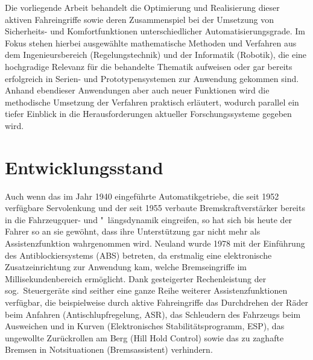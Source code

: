 Die vorliegende Arbeit behandelt die Optimierung und Realisierung dieser aktiven Fahreingriffe sowie deren Zusammenspiel bei der Umsetzung von Sicherheits- und Komfortfunktionen unterschiedlicher Automatisierungsgrade. Im Fokus stehen hierbei ausgewählte mathematische Methoden und Verfahren aus dem Ingenieursbereich (Regelungstechnik) und der Informatik (Robotik), die eine hochgradige Relevanz für die behandelte Thematik aufweisen oder gar bereits erfolgreich in Serien- und Prototypensystemen zur Anwendung gekommen sind. Anhand ebendieser Anwendungen aber auch neuer Funktionen wird die methodische Umsetzung der Verfahren praktisch erläutert, wodurch parallel ein tiefer Einblick in die Herausforderungen aktueller Forschungssysteme gegeben wird. 

\section{Entwicklungsstand}
Auch wenn das im Jahr 1940 eingeführte Automatikgetriebe, die seit 1952 verfügbare Servolenkung und der seit 1955 verbaute Bremskraftverstärker bereits in die Fahrzeugquer- und "~längsdynamik eingreifen, so hat sich bis heute der Fahrer so an sie gewöhnt, dass ihre Unterstützung gar nicht mehr als Assistenzfunktion wahrgenommen wird. Neuland wurde 1978 mit der Einführung des Antiblockiersystems (ABS) betreten, da erstmalig eine elektronische Zusatzeinrichtung zur Anwendung kam, welche Bremseingriffe im Millisekundenbereich ermöglicht. Dank gesteigerter Rechenleistung der sog.\ Steuergeräte sind seither eine ganze Reihe weiterer Assistenzfunktionen verfügbar, die beispielweise durch aktive Fahreingriffe das Durchdrehen der Räder beim Anfahren (Antischlupfregelung, ASR), das Schleudern des Fahrzeugs beim Ausweichen und in Kurven (Elektronisches Stabilitätsprogramm, ESP), das ungewollte Zurückrollen am Berg (Hill Hold Control) sowie das zu zaghafte Bremsen in Notsituationen (Bremsassistent)
verhindern. \\
